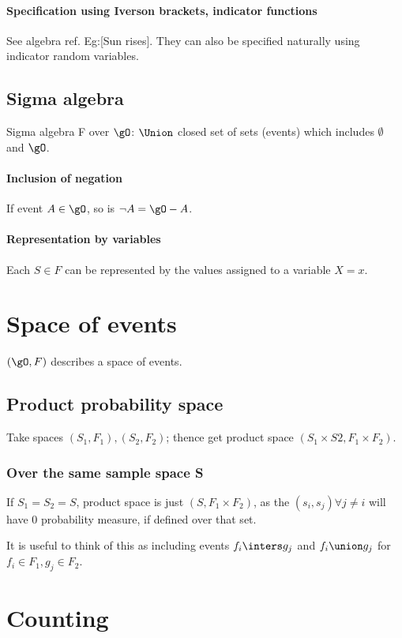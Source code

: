 \documentclass[oneside, article]{memoir}
\begin{document}
\paragraph*{Specification using Iverson brackets, indicator functions}
See algebra ref. Eg:[Sun rises]. They can also be specified naturally using indicator random variables.

\subsection{Sigma algebra}
Sigma algebra F over $\gO$: $\Union$ closed set of sets (events) which includes $\emptyset$ and $\gO$.

\paragraph*{Inclusion of negation}
If event $A \in \gO$, so is $\lnot A = \gO - A$.

\paragraph*{Representation by variables}
Each $S \in F$ can be represented by the values assigned to a variable $X =x$.

\section{Space of events}
$(\gO, F)$ describes a space of events.

\subsection{Product probability space}
Take spaces $(S_1, F_1), (S_2, F_2)$; thence get product space $(S_1 \times S2, F_1 \times F_2)$.

\subsubsection{Over the same sample space S}
If $S_1 = S_2 = S$, product space is just $(S, F_1 \times F_2)$, as the $(s_i, s_j) \forall j \neq i$ will have 0 probability measure, if defined over that set.

It is useful to think of this as including events $f_i \inters g_j$ and $f_i \union g_j$ for $f_i \in F_1, g_j \in F_2$.

\section{Counting}
\end{document}

